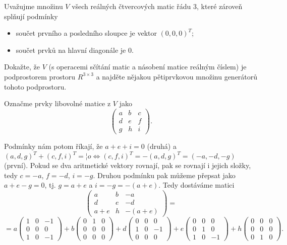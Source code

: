 \documentclass[12pt]{article}					%
\begin{document}
    \begin{priklad}[6.1]
        Uvažujme množinu $V$ všech reálných čtvercových matic řádu 3, které zároveň splňují podmínky
        \begin{itemize}
            \item součet prvního a posledního sloupce je vektor $(0, 0, 0)^T$;
            \item součet prvků na hlavní diagonále je 0.
        \end{itemize}
        Dokažte, že $V$ (s operacemi sčítání matic a násobení matice reálným číslem) je podprostorem prostoru $R^{3\times3}$ a najděte nějakou pětiprvkovou množinu generátorů tohoto podprostoru.

        \begin{reseni}
            Označme prvky libovolné matice z $V$ jako
            $$ \begin{pmatrix} a & b & c \\ d & e & f \\  g & h & i \end{pmatrix}. $$

            Podmínky nám potom říkají, že $a + e + i = 0$ (druhá) a $(a, d, g)^T + (c, f, i)^T = ¦o \Leftrightarrow (c, f, i)^T = -(a, d, g)^T = (-a, -d, -g)$ (první). Pokud se dva aritmetické vektory rovnají, pak se rovnají i jejich složky, tedy $c = -a$, $f = -d$, $i = -g$. Druhou podmínku pak můžeme přepsat jako $a + e - g = 0$, tj. $g = a + e$ a $i = -g = -(a + e)$. Tedy dostáváme matici
            $$ \begin{pmatrix} a & b & -a \\ d & e & -d \\ a + e & h & -(a + e)  \end{pmatrix} = $$ $$ = a\begin{pmatrix} 1 & 0 & -1 \\ 0 & 0 & 0 \\ 1 & 0 & -1  \end{pmatrix} + b\begin{pmatrix} 0 & 1 & 0 \\ 0 & 0 & 0 \\ 0 & 0 & 0 \end{pmatrix} + d\begin{pmatrix} 0 & 0 & 0 \\ 1 & 0 & -1 \\ 0 & 0 & 0 \end{pmatrix} + e\begin{pmatrix} 0 & 0 & 0 \\ 0 & 1 & 0 \\ 1 & 0 & -1  \end{pmatrix} + h\begin{pmatrix} 0 & 0 & 0 \\ 0 & 0 & 0 \\ 0 & 1 & 0 \end{pmatrix}. $$
            

\end{reseni}
\end{priklad}
\end{document}
